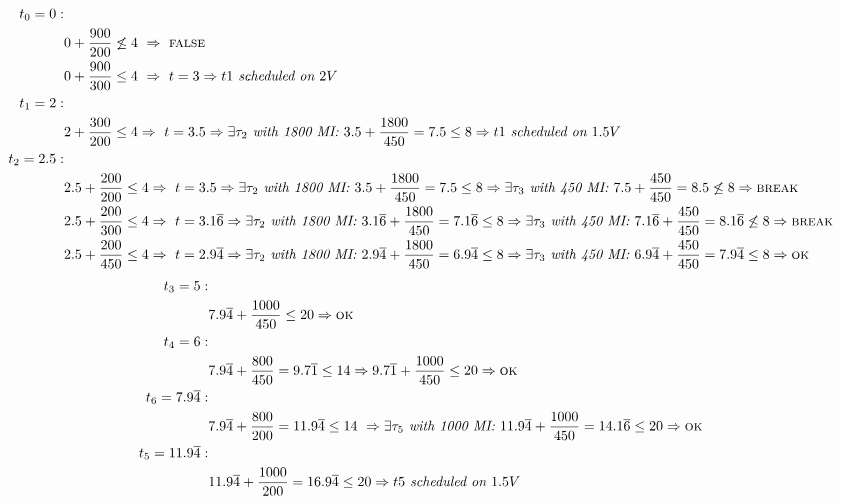 \documentclass{article}
\begin{document}
	\begin{adjustwidth}{-8.5em}{}
		\begin{align*}
			t_0 = 0: & \\
			& 0 + \frac{900}{200} \not\leq 4 \ \Rightarrow \ \textsc{false} \\
			& 0 + \frac{900}{300} \leq 4 \ \Rightarrow \ t = 3 \Rightarrow t1 \textit{ scheduled on } 2V  \\
			t_1 = 2: & \\
			& 2 + \frac{300}{200} \leq 4 \Rightarrow \ t = 3.5 \Rightarrow \exists \tau_2 \textit{ with 1800 MI: } 3.5 + \frac{1800}{450} = 7.5 \leq 8  \Rightarrow t1 \textit{ scheduled on } 1.5V \\
			t_2 = 2.5: & \\
			& 2.5 + \frac{200}{200} \leq 4 \Rightarrow \ t = 3.5 \Rightarrow \exists \tau_2 \textit{ with 1800 MI: } 3.5 + \frac{1800}{450} = 7.5 \leq 8  \Rightarrow \exists \tau_3 \textit{ with 450 MI: } 7.5 + \frac{450}{450} = 8.5 \not\leq 8 \Rightarrow \textsc{break}\\
			& 2.5 + \frac{200}{300} \leq 4 \Rightarrow \ t = 3.1\overline{6} \Rightarrow \exists \tau_2 \textit{ with 1800 MI: } 3.1\overline{6} + \frac{1800}{450} = 7.1\overline{6} \leq 8  \Rightarrow \exists \tau_3 \textit{ with 450 MI: } 7.1\overline{6} + \frac{450}{450} = 8.1\overline{6} \not\leq 8 \Rightarrow \textsc{break}\\
			& 2.5 + \frac{200}{450} \leq 4 \Rightarrow \ t = 2.9\overline{4} \Rightarrow \exists \tau_2 \textit{ with 1800 MI: } 2.9\overline{4} + \frac{1800}{450} = 6.9\overline{4} \leq 8  \Rightarrow \exists \tau_3 \textit{ with 450 MI: } 6.9\overline{4} + \frac{450}{450} = 7.9\overline{4} \leq 8 \Rightarrow \textsc{ok}\\
		\end{align*}
		\begin{align*}
		t_3 = 5: & \\
			& 7.9\overline{4} + \frac{1000}{450} \leq 20 \Rightarrow \textsc{ok} \\
			t_4 = 6: & \\
			& 7.9\overline{4} + \frac{800}{450} = 9.7\overline{1} \leq 14 \Rightarrow 9.7\overline{1} + \frac{1000}{450} \leq 20 \Rightarrow \textsc{ok} \\
			t_6 = 7.9\overline{4}: & \\
			& 7.9\overline{4} + \frac{800}{200} = 11.9\overline{4} \leq 14 \ \Rightarrow \exists \tau_5 \textit{ with 1000 MI: } 11.9\overline{4} + \frac{1000}{450} = 14.1\overline{6} \leq 20 \Rightarrow \textsc{ok} \\
			t_5 = 11.9\overline{4}: & \\
			& 11.9\overline{4} + \frac{1000}{200} = 16.9\overline{4} \leq 20 \Rightarrow t5 \textit{ scheduled on } 1.5V
		\end{align*}
	\end{adjustwidth}
\end{document}
